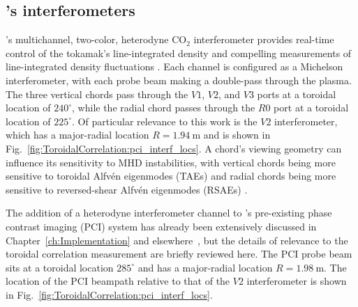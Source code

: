 \subsection{\diiid's interferometers}
\diiid's multichannel, two-color, heterodyne CO$_2$ interferometer
provides real-time control of the tokamak's line-integrated density
\cite{carlstrom_rsi88} and
compelling measurements of line-integrated density fluctuations
\cite{vanzeeland_ppcf05,pace_nf17}.
Each channel is configured as a Michelson interferometer,
with each probe beam making a double-pass through the plasma.
The three vertical chords pass through the $V1$, $V2$, and $V3$ ports
at a toroidal location of $240^{\circ}$, while
the radial chord passes through the $R0$ port
at a toroidal location of $225^{\circ}$.
Of particular relevance to this work is the $V2$ interferometer,
which has a major-radial location $R = \SI{1.94}{\meter}$ and
is shown in Fig.~\ref{fig:ToroidalCorrelation:pci_interf_locs}.
A chord's viewing geometry can influence
its sensitivity to MHD instabilities,
with vertical chords being more sensitive to
toroidal Alfv\'{e}n eigenmodes (TAEs) and
radial chords being more sensitive to
reversed-shear Alfv\'{e}n eigenmodes (RSAEs)
\cite{vanzeeland_ppcf05}.

The addition of a heterodyne interferometer channel
to \diiid's pre-existing phase contrast imaging (PCI) system
has already been extensively discussed in
Chapter~\ref{ch:Implementation} and
elsewhere~\cite{davis_rsi16}, but
the details of relevance to the toroidal correlation measurement
are briefly reviewed here.
The PCI probe beam sits at a toroidal location $285^{\circ}$ and
has a major-radial location $R = \SI{1.98}{\meter}$.
The location of the PCI beampath relative to that of the $V2$ interferometer
is shown in Fig.~\ref{fig:ToroidalCorrelation:pci_interf_locs}.

